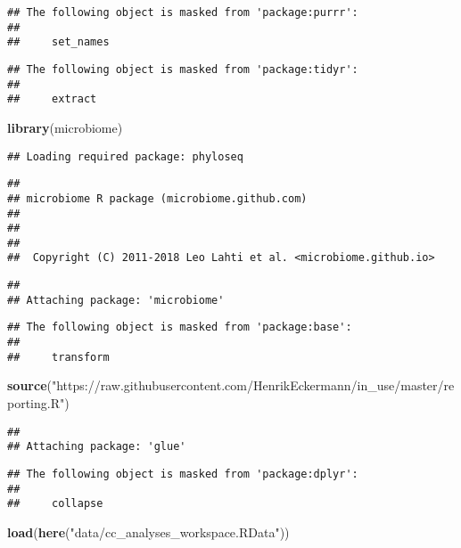 \documentclass[]{article}
\newenvironment{Shaded}{\begin{snugshade}}{\end{snugshade}}
\newcommand{\KeywordTok}[1]{\textcolor[rgb]{0.13,0.29,0.53}{\textbf{#1}}}
\newcommand{\StringTok}[1]{\textcolor[rgb]{0.31,0.60,0.02}{#1}}
\newcommand{\NormalTok}[1]{#1}
\begin{document}
\begin{verbatim}
## The following object is masked from 'package:purrr':
## 
##     set_names
\end{verbatim}

\begin{verbatim}
## The following object is masked from 'package:tidyr':
## 
##     extract
\end{verbatim}

\begin{Shaded}
\begin{Highlighting}[]
\KeywordTok{library}\NormalTok{(microbiome)}
\end{Highlighting}
\end{Shaded}

\begin{verbatim}
## Loading required package: phyloseq
\end{verbatim}

\begin{verbatim}
## 
## microbiome R package (microbiome.github.com)
##     
## 
## 
##  Copyright (C) 2011-2018 Leo Lahti et al. <microbiome.github.io>
\end{verbatim}

\begin{verbatim}
## 
## Attaching package: 'microbiome'
\end{verbatim}

\begin{verbatim}
## The following object is masked from 'package:base':
## 
##     transform
\end{verbatim}

\begin{Shaded}
\begin{Highlighting}[]
\KeywordTok{source}\NormalTok{(}\StringTok{"https://raw.githubusercontent.com/HenrikEckermann/in_use/master/reporting.R"}\NormalTok{)}
\end{Highlighting}
\end{Shaded}

\begin{verbatim}
## 
## Attaching package: 'glue'
\end{verbatim}

\begin{verbatim}
## The following object is masked from 'package:dplyr':
## 
##     collapse
\end{verbatim}

\begin{Shaded}
\begin{Highlighting}[]
\KeywordTok{load}\NormalTok{(}\KeywordTok{here}\NormalTok{(}\StringTok{"data/cc_analyses_workspace.RData"}\NormalTok{))}
\end{Highlighting}
\end{Shaded}
\end{document}
